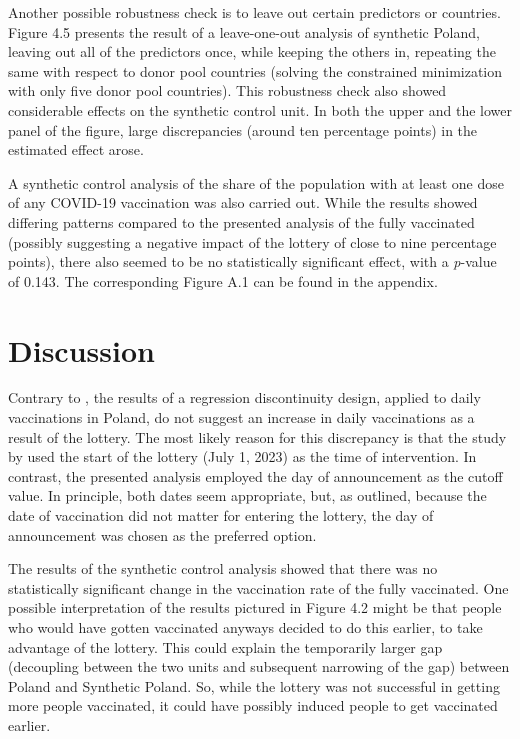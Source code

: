 \documentclass{scrbook}
\begin{document}
Another possible robustness check is to leave out certain predictors or
countries. Figure 4.5 presents the result of a leave-one-out analysis of
synthetic Poland, leaving out all of the predictors once, while keeping
the others in, repeating the same with respect to donor pool countries
(solving the constrained minimization with only five donor pool
countries). This robustness check also showed considerable effects on
the synthetic control unit. In both the upper and the lower panel of the
figure, large discrepancies (around ten percentage points) in the
estimated effect arose.

A synthetic control analysis of the share of the population with at
least one dose of any COVID-19 vaccination was also carried out. While
the results showed differing patterns compared to the presented analysis
of the fully vaccinated (possibly suggesting a negative impact of the
lottery of close to nine percentage points), there also seemed to be no
statistically significant effect, with a \textit{p}-value of 0.143. The
corresponding Figure A.1 can be found in the appendix.

\chapter{Discussion}

Contrary to \textcite{kuznetsova_effectiveness_2022}, the results of a
regression discontinuity design, applied to daily vaccinations in
Poland, do not suggest an increase in daily vaccinations as a result of
the lottery. The most likely reason for this discrepancy is that the
study by \textcite{kuznetsova_effectiveness_2022} used the start of the
lottery (July 1, 2023) as the time of intervention. In contrast, the
presented analysis employed the day of announcement as the cutoff value.
In principle, both dates seem appropriate, but, as outlined, because the
date of vaccination did not matter for entering the lottery, the day of
announcement was chosen as the preferred option.

The results of the synthetic control analysis showed that there was no
statistically significant change in the vaccination rate of the fully
vaccinated. One possible interpretation of the results pictured in
Figure 4.2 might be that people who would have gotten vaccinated anyways
decided to do this earlier, to take advantage of the lottery. This could
explain the temporarily larger gap (decoupling between the two units and
subsequent narrowing of the gap) between Poland and Synthetic Poland.
So, while the lottery was not successful in getting more people
vaccinated, it could have possibly induced people to get vaccinated
earlier.
\end{document}
